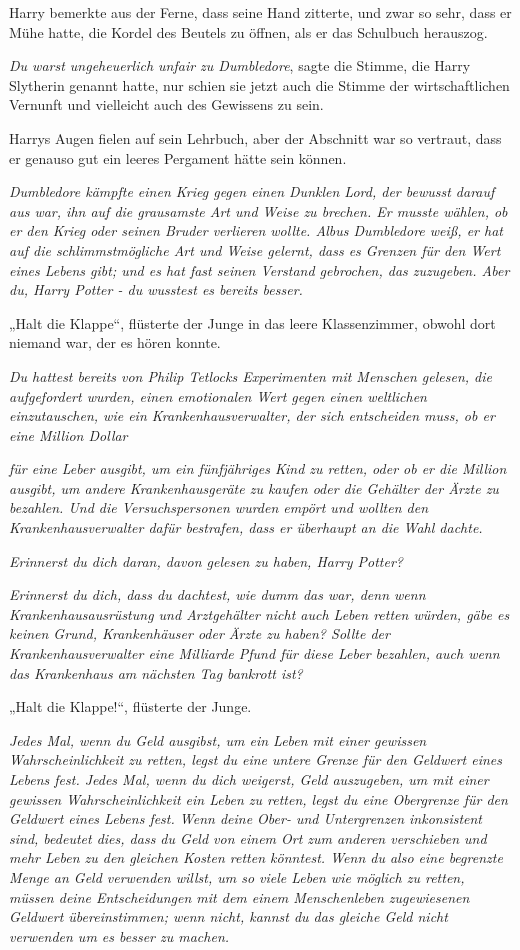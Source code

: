 {Harry bemerkte aus der Ferne, dass seine Hand zitterte, und zwar so sehr, dass er Mühe hatte, die Kordel des Beutels zu öffnen, als er das Schulbuch herauszog.

\emph{Du warst ungeheuerlich unfair zu Dumbledore}, sagte die Stimme, die Harry Slytherin genannt hatte, nur schien sie jetzt auch die Stimme der wirtschaftlichen Vernunft und vielleicht auch des Gewissens zu sein.

Harrys Augen fielen auf sein Lehrbuch, aber der Abschnitt war so vertraut, dass er genauso gut ein leeres Pergament hätte sein können.

\emph{Dumbledore kämpfte einen Krieg gegen einen Dunklen Lord, der bewusst darauf aus war, ihn auf die grausamste Art und Weise zu brechen. Er musste wählen, ob er den Krieg oder seinen Bruder verlieren wollte. Albus Dumbledore weiß, er hat auf die schlimmstmögliche Art und Weise gelernt, dass es Grenzen für den Wert eines Lebens gibt; und es hat fast seinen Verstand gebrochen, das zuzugeben. Aber du, Harry Potter - du wusstest es bereits besser.}

„Halt die Klappe“, flüsterte der Junge in das leere Klassenzimmer, obwohl dort niemand war, der es hören konnte.

\emph{Du hattest bereits von Philip Tetlocks Experimenten mit Menschen gelesen, die aufgefordert wurden, einen emotionalen Wert gegen einen weltlichen einzutauschen, wie ein Krankenhausverwalter, der sich entscheiden muss, ob er eine Million Dollar}

\emph{für eine Leber ausgibt, um ein fünfjähriges Kind zu retten, oder ob er die Million ausgibt, um andere Krankenhausgeräte zu kaufen oder die Gehälter der Ärzte zu bezahlen. Und die Versuchspersonen wurden empört und wollten den Krankenhausverwalter dafür bestrafen, dass er überhaupt an die Wahl dachte.}

\emph{Erinnerst du dich daran, davon gelesen zu haben, Harry Potter?}

\emph{Erinnerst du dich, dass du dachtest, wie dumm das war, denn wenn Krankenhausausrüstung und Arztgehälter nicht auch Leben retten würden, gäbe es keinen Grund, Krankenhäuser oder Ärzte zu haben? Sollte der Krankenhausverwalter eine Milliarde Pfund für diese Leber bezahlen, auch wenn das Krankenhaus am nächsten Tag bankrott ist?}

„Halt die Klappe!“, flüsterte der Junge.

\emph{Jedes Mal, wenn du Geld ausgibst, um ein Leben mit einer gewissen Wahrscheinlichkeit zu retten, legst du eine untere Grenze für den Geldwert eines Lebens fest. Jedes Mal, wenn du dich weigerst, Geld auszugeben, um mit einer gewissen Wahrscheinlichkeit ein Leben zu retten, legst du eine Obergrenze für den Geldwert eines Lebens fest. Wenn deine Ober- und Untergrenzen inkonsistent sind, bedeutet dies, dass du Geld von einem Ort zum anderen verschieben und mehr Leben zu den gleichen Kosten retten könntest. Wenn du also eine begrenzte Menge an Geld verwenden willst, um so viele Leben wie möglich zu retten, müssen deine Entscheidungen mit dem einem Menschenleben zugewiesenen Geldwert übereinstimmen; wenn nicht, kannst du das gleiche Geld nicht verwenden um es besser zu machen.}

}
